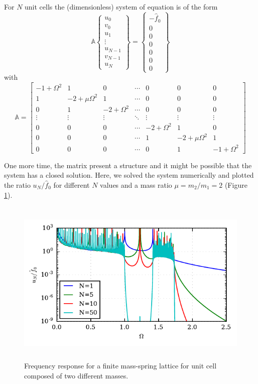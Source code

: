 \documentclass[11pt]{article}
\begin{document}
For $N$ unit cells the (dimensionless) system of equation is of the form
\begin{equation}
\mathbb{A}
\begin{Bmatrix}
u_0 \\ 
v_0 \\ 
u_1 \\ 
\vdots \\ 
u_{N-1} \\ 
v_{N-1} \\ 
u_N
\end{Bmatrix} = 
\begin{Bmatrix}
-\hat{f}_0 \\ 
0 \\ 
0 \\ 
0 \\ 
0 \\ 
0 \\ 
0
\end{Bmatrix}
\end{equation}
with
\[\mathbb{A} = \begin{bmatrix}
-1 + \Omega^2 & 1 & 0 & \cdots & 0 & 0 & 0 \\ 
1 & -2 +\mu \Omega^2 & 1 & \cdots & 0 & 0 & 0 \\ 
0 & 1 & -2 + \Omega^2 & \cdots & 0 & 0 & 0 \\ 
\vdots & \vdots & \vdots & \ddots & \vdots & \vdots & \vdots \\ 
0 & 0 & 0 & \cdots & -2 + \Omega^2 & 1 & 0 \\ 
0 & 0 & 0 & \cdots & 1 & -2 +\mu \Omega^2 & 1 \\ 
0 & 0 & 0 & \cdots & 0 & 1 & -1 + \Omega^2
\end{bmatrix} \]


One more time, the matrix present a structure and it might be  possible that the system has a closed solution. Here, we solved the system numerically and plotted the ratio $u_N/\hat{f}_0$ for different $N$ values and a mass ratio $\mu=m_2/m_1=2$ (Figure \ref{fig:diatomic-finite-disp}).
\begin{figure}[H]
\centering
\includegraphics[height=8cm]{img/diatomic_finite.pdf} 
\caption{Frequency response for a finite mass-spring lattice for unit cell composed of two different masses.}
\label{fig:diatomic-finite-disp}
\end{figure}
\end{document}

